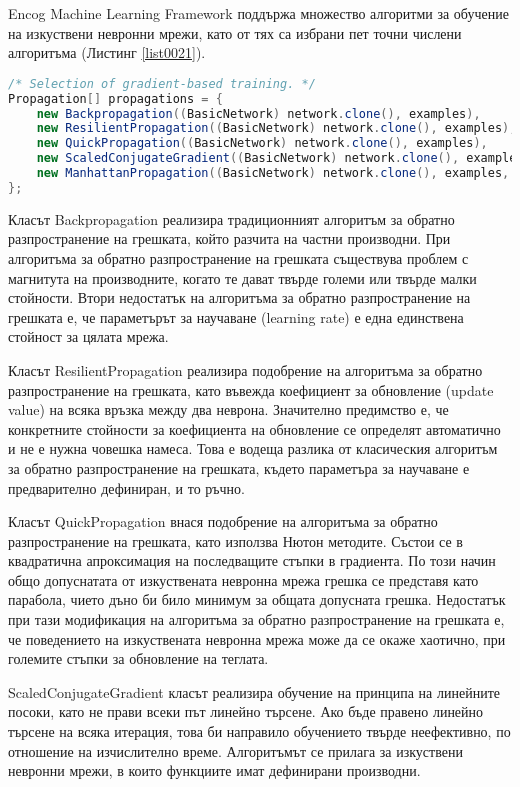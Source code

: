 Encog Machine Learning Framework поддържа множество алгоритми за обучение на изкуствени невронни мрежи, като от тях са избрани пет точни числени алгоритъма (Листинг \ref{list0021}).

\begin{lstlisting}[caption=Набор от точни числени алгоритми, language=Java, basicstyle=\tiny, label=list0021]
/* Selection of gradient-based training. */
Propagation[] propagations = {
	new Backpropagation((BasicNetwork) network.clone(), examples),
	new ResilientPropagation((BasicNetwork) network.clone(), examples),
	new QuickPropagation((BasicNetwork) network.clone(), examples),
	new ScaledConjugateGradient((BasicNetwork) network.clone(), examples),
	new ManhattanPropagation((BasicNetwork) network.clone(), examples, PRNG.nextDouble())
};
\end{lstlisting}

Класът Backpropagation реализира традиционният алгоритъм за обратно разпространение на грешката, който разчита на частни производни. При алгоритъма за обратно разпространение на грешката съществува проблем с магнитута на производните, когато те дават твърде големи или твърде малки стойности. Втори недостатък на алгоритъма за обратно разпространение на грешката е, че параметърът за научаване (learning rate) е една единствена стойност за цялата мрежа. 

Класът ResilientPropagation реализира подобрение на алгоритъма за обратно разпространение на грешката, като въвежда коефициент за обновление (update value) на всяка връзка между два неврона. Значително предимство е, че конкретните стойности за коефициента на обновление се определят автоматично и не е нужна човешка намеса. Това е водеща разлика от класическия алгоритъм за обратно разпространение на грешката, където параметъра за научаване е предварително дефиниран, и то ръчно. 

Класът QuickPropagation внася подобрение на алгоритъма за обратно разпространение на грешката, като използва Нютон методите. Състои се в квадратична апроксимация на последващите стъпки в градиента. По този начин общо допуснатата от изкуствената невронна мрежа грешка се представя като парабола, чието дъно би било минимум за общата допусната грешка. Недостатък при тази модификация на алгоритъма за обратно разпространение на грешката е, че поведението на изкуствената невронна мрежа може да се окаже хаотично, при големите стъпки за обновление на теглата. 

ScaledConjugateGradient класът реализира обучение на принципа на линейните посоки, като не прави всеки път линейно търсене. Ако бъде правено линейно търсене на всяка итерация, това би направило обучението твърде неефективно, по отношение на изчислително време. Алгоритъмът се прилага за изкуствени невронни мрежи, в които функциите имат дефинирани производни. 


